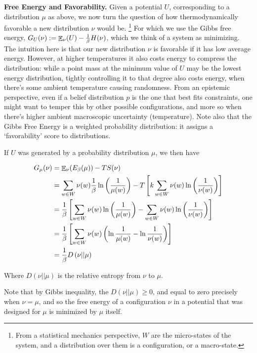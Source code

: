 \documentclass{article}
\numberwithin{equation}{section}
\begin{document}
	\textbf{Free Energy and Favorability.} Given a potential $U$, corresponding to a distribution $\mu$ as above, we now turn the question of how thermodynamically favorable a new distribution $\nu$ would be.%
		\footnote{From a statistical mechanics perspective, $W$ are the micro-states of the system, and a distribution over them is a configuration, or a macro-state.}
	For which we use the Gibbs free energy, $G_U(\nu) := {\mathop{\mathbb E}}_\nu( U ) - \frac{1}{\beta} H(\nu)$, which we think of a system as minimizing. The intuition here is that our new distribution $\nu$ is favorable if it has low average energy. However, at higher temperatures it also costs energy to compress the distribution: while a point mass at the minimum value of $U$ may be the lowest energy distribution, tightly controlling it to that degree also costs energy, when there's some ambient temperature causing randomness. From an epistemic perspective, even if a belief distribution $p$  is the one that best fits constraints, one might want to temper this by other possible configurations, and more so when there's higher ambient macroscopic uncertainty (temperature). Note also that the Gibbs Free Energy is a weighted probability distribution: it assigns a `favorability' score to distributions.
	
	If $U$ was generated by a probability distribution $\mu$, we then have
	
	\begin{align*}
		G_\mu(\nu) &= {\mathop{\mathbb E}}_\nu( E_\beta(\mu) )  - T S(\nu) \\
		&= \sum_{w \in W}\nu(w) \frac{1}{\beta} \ln \left(\frac{1}{\mu(w)}\right) - T \left[k \sum_{w \in W} \nu(w) \ln \left(\frac{1}{\nu(w)}\right)\right]\\
		&=  \frac{1}{\beta}\left[\sum_{w \in W}\nu(w) \ln \left(\frac{1}{\mu(w)}\right) - \sum_{w \in W} \nu(w) \ln \left(\frac{1}{\nu(w)}\right)\right]\\
		&=  \frac{1}{\beta}\left[\sum_{w \in W}\nu(w) \left(\ln \frac{1}{\mu(w)} - \ln \frac{1}{\nu(w)}\right)\right]\\
		&= \frac{1}{\beta} D \left(\nu || \mu \right)
	\end{align*}

	Where $D(\nu || \mu)$ is the relative entropy from $\nu$ to $\mu$. 
	
	Note that by Gibbs inequality, the $D(\nu || \mu) \geq 0$, and equal to zero precisely when $\nu = \mu$, and so the free energy of a configuration $\nu$ in a potential that was designed for $\mu$ is minimized by $\mu$ itself.	
\end{document}
